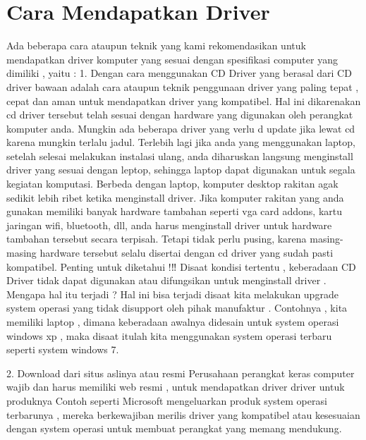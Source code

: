 \section {Cara Mendapatkan Driver}
Ada beberapa cara ataupun teknik yang kami rekomendasikan untuk mendapatkan driver komputer yang sesuai dengan spesifikasi computer yang dimiliki , yaitu :
1.	Dengan cara menggunakan CD 
Driver yang berasal dari CD driver bawaan adalah cara ataupun teknik penggunaan driver yang paling tepat , cepat dan aman untuk mendapatkan driver yang kompatibel.
Hal ini dikarenakan cd driver tersebut telah sesuai dengan hardware yang digunakan oleh perangkat komputer anda. 
Mungkin ada beberapa driver yang verlu d update jika lewat cd karena mungkin terlalu jadul.
Terlebih lagi jika anda yang menggunakan laptop, setelah selesai melakukan instalasi ulang, anda diharuskan langsung menginstall driver yang sesuai dengan leptop, sehingga laptop dapat digunakan untuk segala kegiatan komputasi.
Berbeda dengan laptop, komputer desktop rakitan agak sedikit lebih ribet ketika menginstall driver.
Jika komputer rakitan yang anda gunakan memiliki banyak hardware tambahan seperti vga card addons, kartu jaringan wifi, bluetooth, dll, anda harus menginstall driver untuk hardware tambahan tersebut secara terpisah.
Tetapi tidak perlu pusing, karena masing-masing hardware tersebut selalu disertai dengan cd driver yang sudah pasti kompatibel.
Penting untuk diketahui !‼
Disaat kondisi tertentu  , keberadaan CD Driver tidak dapat digunakan atau difungsikan untuk menginstall driver . Mengapa hal itu terjadi ? Hal ini bisa terjadi disaat kita melakukan upgrade system operasi yang tidak disupport oleh pihak manufaktur . Contohnya , kita memiliki laptop , dimana keberadaan awalnya didesain untuk system operasi windows xp , maka disaat itulah kita menggunakan system operasi terbaru seperti system windows 7.

2. Download dari situs aslinya atau resmi
Perusahaan perangkat keras computer wajib dan harus memiliki web resmi , untuk mendapatkan driver driver untuk produknya
Contoh seperti Microsoft mengeluarkan produk system operasi terbarunya , mereka berkewajiban merilis driver yang kompatibel atau kesesuaian dengan system operasi untuk membuat perangkat yang memang mendukung.

